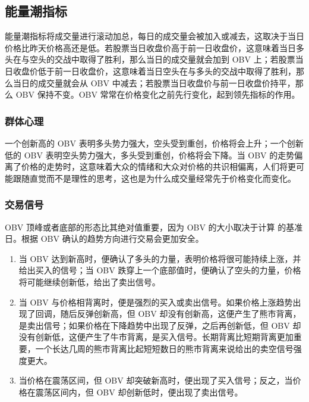 \subsection{能量潮指标}
能量潮指标将成交量进行滚动加总，每日的成交量会被加入或减去，这取决于当日价格比昨天价格高还是低。若股票当日收盘价高于前一日收盘价，这意味着当日多头在与空头的交战中取得了胜利，那么当日的成交量就会加到 OBV 上；若股票当日收盘价低于前一日收盘价，这意味着当日空头在与多头的交战中取得了胜利，那么当日的成交量就会从 OBV 中减去；若股票当日收盘价与前一日收盘价持平，那么 OBV 保持不变。OBV 常常在价格变化之前先行变化，起到领先指标的作用。
\subsubsection*{群体心理}
一个创新高的 OBV 表明多头势力强大，空头受到重创，价格将会上升；一个创新低的 OBV 表明空头势力强大，多头受到重创，价格将会下降。当 OBV 的走势偏离了价格的走势时，这意味着大众的情绪和大众对价格的共识相偏离，人们将更可能跟随直觉而不是理性的思考，这也是为什么成交量经常先于价格变化而变化。
\subsubsection*{交易信号}
OBV 顶峰或者底部的形态比其绝对值重要，因为 OBV 的大小取决于计算
的基准日。根据 OBV 确认的趋势方向进行交易会更加安全。
\begin{enumerate}
    \item 当 OBV 达到新高时，便确认了多头的力量，表明价格将很可能持续上涨，并给出买入的信号；当 OBV 跌穿上一个底部值时，便确认了空头的力量，价格将可能继续创新低，给出了卖出信号。
    \item 当 OBV 与价格相背离时，便是强烈的买入或卖出信号。如果价格上涨趋势出现了回调，随后反弹创新高，但 OBV 却没有创新高，这便产生了熊市背离，是卖出信号；如果价格在下降趋势中出现了反弹，之后再创新低，但 OBV 却没有创新低，这便产生了牛市背离，是买入信号。长期背离比短期背离更加重要，一个长达几周的熊市背离比起短短数日的熊市背离来说给出的卖空信号强度更大。
    \item 当价格在震荡区间，但 OBV 却突破新高时，便出现了买入信号；反之，当价格在震荡区间内，但 OBV 却创新低时，便出现了卖出信号。
\end{enumerate}
